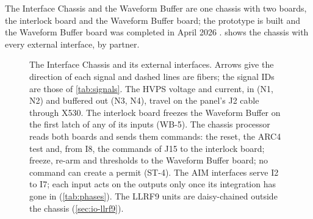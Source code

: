 The Interface Chassis and the Waveform Buffer are one chassis with two boards, the
interlock board and the Waveform Buffer board; the prototype is built and
the Waveform Buffer board was completed in April 2026 .  shows
the chassis with every external interface, by partner.

\begin{figure}[p]
\centering
\begin{fitpicture}

\end{fitpicture}
\caption[The Interface Chassis and its external interfaces.]{The Interface Chassis and
its external interfaces. Arrows give the direction of each signal and dashed lines
are fibers; the signal IDs are those of \cref{tab:signals}. The HVPS voltage and
current, in (N1, N2) and buffered out (N3, N4), travel on the panel's J2 cable through
X530. The interlock board freezes the Waveform Buffer on the first latch of any of its
inputs (WB-5). The chassis processor reads both boards and sends them commands: the
reset, the ARC4 test and, from I8, the commands of J15 to the interlock board; freeze,
re-arm and thresholds to the Waveform Buffer board; no command can create a permit
(ST-4). The AIM interfaces serve
I2 to I7; each input acts on the outputs only once its integration has gone in
(\cref{tab:phases}). The
LLRF9 units are daisy-chained outside the chassis
(\cref{sec:io-llrf9}).}\label{fig:context}
\end{figure}

